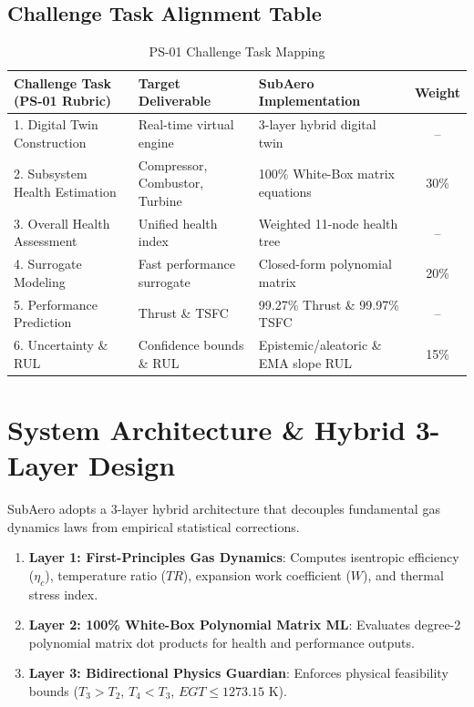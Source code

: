 \documentclass[11pt,a4paper]{article}
\begin{document}
\subsection{Challenge Task Alignment Table}
\begin{table}[H]
\centering
\begin{tabular}{lllc}
\toprule
\textbf{Challenge Task (PS-01 Rubric)} & \textbf{Target Deliverable} & \textbf{SubAero Implementation} & \textbf{Weight} \\
\midrule
1. Digital Twin Construction & Real-time virtual engine & 3-layer hybrid digital twin & -- \\
2. Subsystem Health Estimation & Compressor, Combustor, Turbine & 100\% White-Box matrix equations & 30\% \\
3. Overall Health Assessment & Unified health index & Weighted 11-node health tree & -- \\
4. Surrogate Modeling & Fast performance surrogate & Closed-form polynomial matrix & 20\% \\
5. Performance Prediction & Thrust \& TSFC & 99.27\% Thrust \& 99.97\% TSFC & -- \\
6. Uncertainty \& RUL & Confidence bounds \& RUL & Epistemic/aleatoric \& EMA slope RUL & 15\% \\
\bottomrule
\end{tabular}
\caption{PS-01 Challenge Task Mapping}
\end{table}

\section{System Architecture \& Hybrid 3-Layer Design}
SubAero adopts a 3-layer hybrid architecture that decouples fundamental gas dynamics laws from empirical statistical corrections.

\begin{enumerate}
    \item \textbf{Layer 1: First-Principles Gas Dynamics}: Computes isentropic efficiency ($\eta_c$), temperature ratio ($TR$), expansion work coefficient ($W$), and thermal stress index.
    \item \textbf{Layer 2: 100\% White-Box Polynomial Matrix ML}: Evaluates degree-2 polynomial matrix dot products for health and performance outputs.
    \item \textbf{Layer 3: Bidirectional Physics Guardian}: Enforces physical feasibility bounds ($T_3 > T_2$, $T_4 < T_3$, $EGT \le 1273.15$ K).
\end{enumerate}
\end{document}
